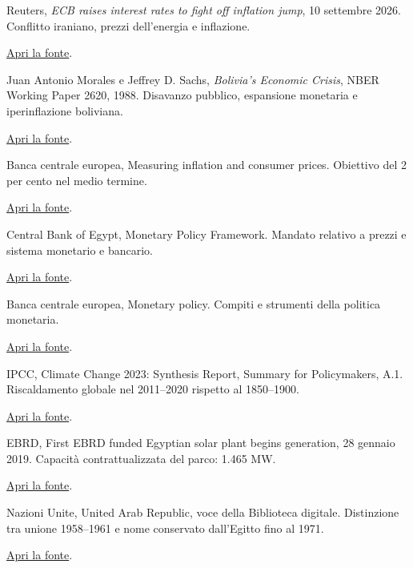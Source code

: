 \begin{enumerate}[label={[\arabic*]},itemsep=8pt]
\item\label{src:iran2026} Reuters, \emph{ECB raises interest rates to fight off inflation jump}, 10 settembre 2026. Conflitto iraniano, prezzi dell'energia e inflazione.\par\href{https://www.reuters.com/business/ecb-raises-interest-rates-fight-off-inflation-jump-2026-09-10/}{\small Apri la fonte}.
\item\label{src:bolivia} Juan Antonio Morales e Jeffrey D. Sachs, \emph{Bolivia's Economic Crisis}, NBER Working Paper 2620, 1988. Disavanzo pubblico, espansione monetaria e iperinflazione boliviana.\par\href{https://www.nber.org/papers/w2620}{\small Apri la fonte}.
\item\label{src:bceobiettivo} Banca centrale europea, Measuring inflation and consumer prices. Obiettivo del 2 per cento nel medio termine.\par\href{https://www.ecb.europa.eu/stats/macroeconomic_and_sectoral/hicp/html/index.en.html}{\small Apri la fonte}.
\item\label{src:cbe} Central Bank of Egypt, Monetary Policy Framework. Mandato relativo a prezzi e sistema monetario e bancario.\par\href{https://www.cbe.org.eg/en/monetary-policy/monetary-policy-framework}{\small Apri la fonte}.
\item\label{src:bcemonetaria} Banca centrale europea, Monetary policy. Compiti e strumenti della politica monetaria.\par\href{https://www.ecb.europa.eu/ecb/orga/tasks/monpol/html/index.en.html}{\small Apri la fonte}.
\item\label{src:clima} IPCC, Climate Change 2023: Synthesis Report, Summary for Policymakers, A.1. Riscaldamento globale nel 2011--2020 rispetto al 1850--1900.\par\href{https://www.unep.org/resources/report/climate-change-2023-synthesis-report}{\small Apri la fonte}.
\item\label{src:benban} EBRD, First EBRD funded Egyptian solar plant begins generation, 28 gennaio 2019. Capacità contrattualizzata del parco: 1.465 MW.\par\href{https://www.ebrd.com/home/news-and-events/news/2019/first-ebrd-funded-egyptian-solar-plant-begins-generation.html}{\small Apri la fonte}.
\item\label{src:rauonu} Nazioni Unite, United Arab Republic, voce della Biblioteca digitale. Distinzione tra unione 1958--1961 e nome conservato dall’Egitto fino al 1971.\par\href{https://digitallibrary.un.org/record/1284346?ln=en}{\small Apri la fonte}.

\end{enumerate}
